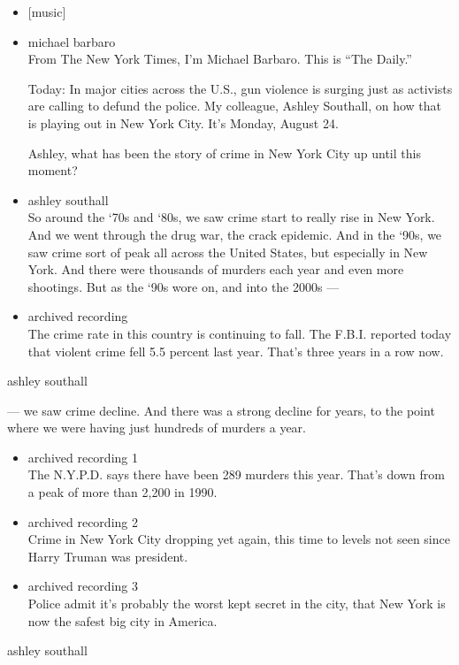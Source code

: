 \begin{itemize}
\item
  {[}music{]}
\item
  michael barbaro\\
  From The New York Times, I'm Michael Barbaro. This is ``The Daily.''

  Today: In major cities across the U.S., gun violence is surging just
  as activists are calling to defund the police. My colleague, Ashley
  Southall, on how that is playing out in New York City. It's Monday,
  August 24.

  Ashley, what has been the story of crime in New York City up until
  this moment?
\item
  ashley southall\\
  So around the `70s and `80s, we saw crime start to really rise in New
  York. And we went through the drug war, the crack epidemic. And in the
  `90s, we saw crime sort of peak all across the United States, but
  especially in New York. And there were thousands of murders each year
  and even more shootings. But as the `90s wore on, and into the 2000s
  ---
\item
  archived recording\\
  The crime rate in this country is continuing to fall. The F.B.I.
  reported today that violent crime fell 5.5 percent last year. That's
  three years in a row now.
\end{itemize}

ashley southall

--- we saw crime decline. And there was a strong decline for years, to
the point where we were having just hundreds of murders a year.

\begin{itemize}
\item
  archived recording 1\\
  The N.Y.P.D. says there have been 289 murders this year. That's down
  from a peak of more than 2,200 in 1990.
\item
  archived recording 2\\
  Crime in New York City dropping yet again, this time to levels not
  seen since Harry Truman was president.
\item
  archived recording 3\\
  Police admit it's probably the worst kept secret in the city, that New
  York is now the safest big city in America.
\end{itemize}

ashley southall

